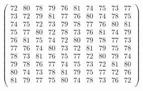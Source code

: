 \documentclass[11pt,a4paper]{amsart}
\begin{document}
\begin{align*}
\left(\begin{array}{rrrrrrrrrr}%
72&80&78&79&76&81&74&75&73&77\\%
73&72&79&81&77&76&80&74&78&75\\%
74&75&72&73&79&78&77&76&80&81\\%
75&77&80&72&78&73&76&81&74&79\\%
76&81&75&74&72&80&79&78&77&73\\%
77&76&74&80&73&72&81&79&75&78\\%
78&73&81&76&75&77&72&80&79&74\\%
79&78&76&77&74&75&73&72&81&80\\%
80&74&73&78&81&79&75&77&72&76\\%
81&79&77&75&80&74&78&73&76&72\\%
\end{array}\right)%
\end{align*}
\end{document}
